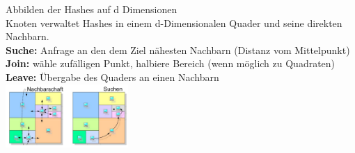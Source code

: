 Abbilden der Hashes auf d Dimensionen\\
Knoten verwaltet Hashes in einem d-Dimensionalen Quader und seine direkten Nachbarn.\\
\textbf{Suche:} Anfrage an den dem Ziel nähesten Nachbarn (Distanz vom Mittelpunkt)\\
\textbf{Join:} wähle zufälligen Punkt, halbiere Bereich (wenn möglich zu Quadraten)	\\
\textbf{Leave:} Übergabe des Quaders an einen Nachbarn \\
\includegraphics[width=0.35\textwidth]{CAN}

